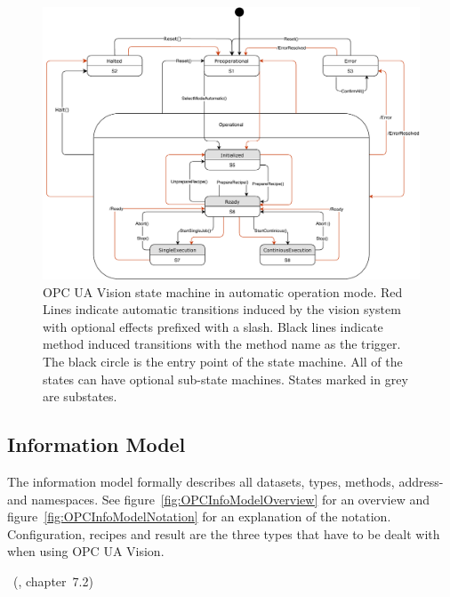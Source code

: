 \begin{figure}[ht]
    \centering
    \includegraphics[width=\textwidth]{img/OPCUAVisionVisionAutomaticModeStateMachineStates.pdf}
    \caption[OPC UA Vision state machine in automatic operation mode]{OPC UA Vision state machine in automatic operation mode. Red Lines indicate automatic transitions induced by the vision system with optional effects prefixed with a slash. Black lines indicate method induced transitions with the method name as the trigger. The black circle is the entry point of the state machine. All of the states can have optional sub-state machines. States marked in grey are substates.~\cite{VDMA2018OPC40100-1:2018-11}}
    \label{fig:OPCStateMachineAutomatic}
\end{figure}
\newpage
\subsection{Information Model}
The information model formally describes all datasets, types, methods, address- and namespaces. See figure~\ref{fig:OPCInfoModelOverview} for an overview and figure~\ref{fig:OPCInfoModelNotation} for an explanation of the notation. Configuration, recipes and result are the three types that have to be dealt with when using OPC UA Vision.

~(\cite{OPC-Foundation2018OPC1.04}, chapter~7.2)

